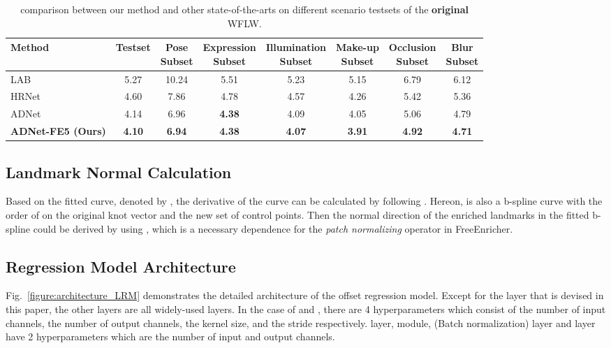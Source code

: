 \documentclass[letterpaper]{article} \usepackage{aaai23}  \usepackage{times}  \usepackage{helvet}  \usepackage{courier}  \usepackage[hyphens]{url}  \usepackage{graphicx} \urlstyle{rm} \def\UrlFont{\rm}  \usepackage{natbib}  \usepackage{caption} \frenchspacing  \setlength{\pdfpagewidth}{8.5in}  \setlength{\pdfpageheight}{11in}  \usepackage{algorithm}
\begin{document}
\begin{table*}[hbtp]
\small
\begin{center}
\begin{tabular}{lccccccc}
\hline
Method & Testset & \makecell{Pose \\ Subset} & \makecell{Expression \\ Subset} & \makecell{Illumination \\ Subset} & \makecell{Make-up \\ Subset} & \makecell{Occlusion \\ Subset} & \makecell{Blur \\ Subset} \\
\hline
LAB \cite{wu2018look} & 5.27 & 10.24 & 5.51 & 5.23 & 5.15 & 6.79 & 6.12 \\
HRNet \cite{wang2020deep} & 4.60 & 7.86 & 4.78 & 4.57 & 4.26 & 5.42 & 5.36 \\
ADNet \cite{huang2021adnet} & 4.14 & 6.96 & \textbf{4.38} & 4.09 & 4.05 & 5.06 & 4.79 \\
\textbf{ADNet-FE5 (Ours)} & \textbf{4.10} & \textbf{6.94} & \textbf{4.38} & \textbf{4.07} & \textbf{3.91} & \textbf{4.92} & \textbf{4.71} \\
\hline
\end{tabular}
\end{center}
\caption{ comparison between our method and other state-of-the-arts on different scenario testsets of the \textbf{original} WFLW.}
\label{table:WFLW_origin}
\end{table*}

\subsection{Landmark Normal Calculation}
Based on the fitted curve, denoted by , the derivative  of the curve can be calculated by following  \cite{prochazkova2005derivative}.
Hereon,  is also a b-spline curve with the order of  on the original knot vector and the new set of control points.
Then the normal direction of the enriched landmarks in the fitted b-spline could be derived by using , which is a necessary dependence for the \emph{patch normalizing} operator in FreeEnricher.

\subsection{Regression Model Architecture}
Fig.~\ref{figure:architecture_LRM} demonstrates the detailed architecture of the offset regression model. 
Except for the  layer that is devised in this paper, the other layers are all widely-used layers.
In the case of  and , there are 4 hyperparameters which consist of the number of input channels, the number of output channels, the kernel size, and the stride respectively.
 layer,  module,  (Batch normalization) layer and  layer have 2 hyperparameters which are the number of input and output channels.
\end{document}
